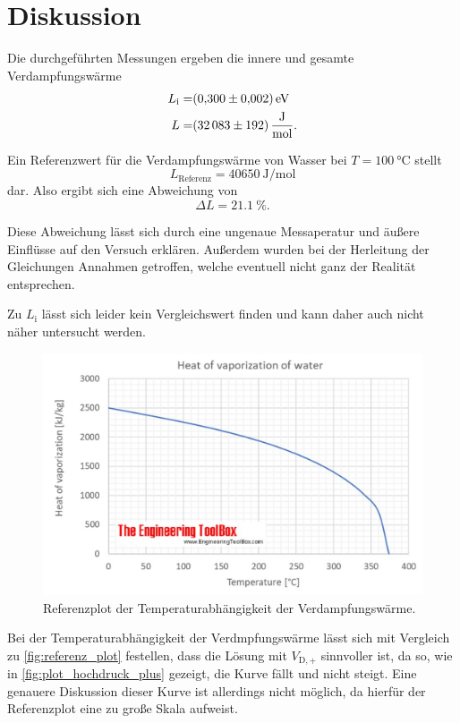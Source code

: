 \section{Diskussion}
\label{sec:Diskussion}


Die durchgeführten Messungen ergeben die innere und gesamte Verdampfungswärme
\begin{align*}
    L_\text{i} =& \SI{0.300+-0.002}{\electronvolt} \\
    L =& \SI{32083+-192}{\joule\per\mol}.
\end{align*}

Ein Referenzwert für die Verdampfungswärme von Wasser bei $T = \SI{100}{\celsius}$ stellt
\begin{equation*}
    L_\text{Referenz} = \SI{40650}{\joule\per\mol}
\end{equation*}
dar. \cite{Verdampfungswaerme}
Also ergibt sich eine Abweichung von
\begin{equation}
    \Delta L = \SI{21.1}{\percent}.
\end{equation}

Diese Abweichung lässt sich durch eine ungenaue Messaperatur und äußere Einflüsse auf den Versuch erklären. 
Außerdem wurden bei der Herleitung der Gleichungen Annahmen getroffen, welche eventuell nicht ganz der Realität entsprechen.

Zu $L_\text{i}$ lässt sich leider kein Vergleichswert finden und kann daher auch nicht näher untersucht werden.

\begin{figure}
    \centering
    \includegraphics[width=\textwidth]{images/referenz.png}
    \caption{Referenzplot der Temperaturabhängigkeit der Verdampfungswärme. \cite{Verdampfungswaerme}}
    \label{fig:referenz_plot}
\end{figure}

Bei der Temperaturabhängigkeit der Verdmpfungswärme lässt sich mit Vergleich zu \autoref{fig:referenz_plot} festellen, dass die Lösung mit $V_{\text{D},+}$ sinnvoller ist, da so, wie in \autoref{fig:plot_hochdruck_plus} gezeigt, die Kurve fällt und nicht steigt.
Eine genauere Diskussion dieser Kurve ist allerdings nicht möglich, da hierfür der Referenzplot eine zu große Skala aufweist.
